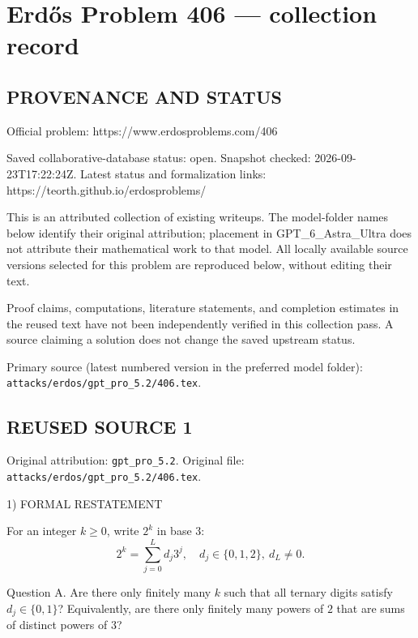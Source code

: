 \section*{Erd\H{o}s Problem 406 --- collection record}

\subsection*{PROVENANCE AND STATUS}
Official problem: https://www.erdosproblems.com/406

Saved collaborative-database status: open.
Snapshot checked: 2026-09-23T17:22:24Z.
Latest status and formalization links: https://teorth.github.io/erdosproblems/

This is an attributed collection of existing writeups. The model-folder names below identify their original attribution; placement in GPT\_6\_Astra\_Ultra does not attribute their mathematical work to that model. All locally available source versions selected for this problem are reproduced below, without editing their text.

Proof claims, computations, literature statements, and completion estimates in the reused text have not been independently verified in this collection pass. A source claiming a solution does not change the saved upstream status.

Primary source (latest numbered version in the preferred model folder): \texttt{attacks/erdos/gpt\_pro\_5.2/406.tex}.

\subsection*{REUSED SOURCE 1}
Original attribution: \texttt{gpt\_pro\_5.2}.
Original file: \texttt{attacks/erdos/gpt\_pro\_5.2/406.tex}.


1) FORMAL RESTATEMENT

For an integer $k\ge 0$, write $2^k$ in base $3$:
\[
2^k=\sum_{j=0}^L d_j 3^j,\quad d_j\in\{0,1,2\},\ d_L\ne 0.
\]

Question A.
Are there only finitely many $k$ such that all ternary digits satisfy $d_j\in\{0,1\}$?
Equivalently, are there only finitely many powers of $2$ that are sums of distinct powers of $3$?

